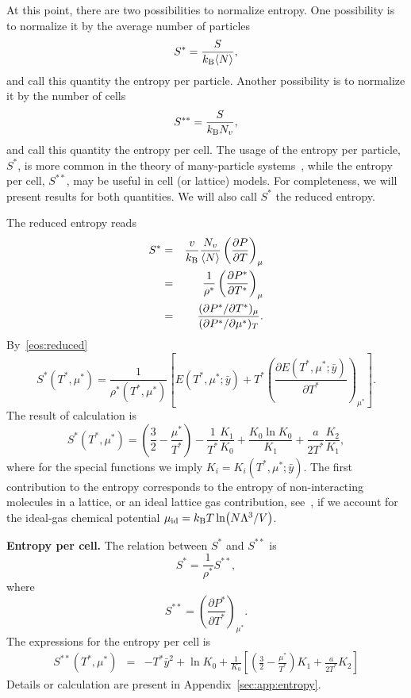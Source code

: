 \documentclass[12pt]{article}
\numberwithin{equation}{section}
\begin{document}
	At this point, there are two possibilities to normalize entropy. One possibility is to normalize it by the average number of particles
	\begin{equation}
		S^{*} = \frac{S}{k_{\rm B} \langle N \rangle},
	\end{equation}
	and call this quantity the entropy per particle. Another possibility is to normalize it by the number of cells
	\begin{equation}
		S^{**} = \frac{S}{k_{\rm B}N_v},
	\end{equation}
	and call this quantity the entropy per cell. The usage of the entropy per particle, $S^*$, is more common in the theory of many-particle systems~\cite{HansenMcDonald13}, while the entropy per cell, $S^{**}$, may be useful in cell (or lattice) models. For completeness, we will present results for both quantities. We will also call $S^*$ the reduced entropy.
	
	
	The reduced entropy reads
	\begin{eqnarray}
		S^* & = & \frac{v}{k_{\rm B}} \frac{N_v}{\langle N \rangle} \left(\frac{\partial P}{\partial T}\right)_{\mu}
		\\
		& = & \frac{1}{\rho^*}\left(\frac{\partial P^*}{\partial T^*}\right)_{\mu}
		\\
		& = & \frac{(\partial P^* / \partial T^*)_{\mu}}{(\partial P^* / \partial \mu^*)_T}.
	\end{eqnarray}
	By~\eqref{eos:reduced}
	\begin{equation}
		\label{eq:entropy}
		S^*(T^*,\mu^*) = \frac{1}{\rho^*(T^*,\mu^*)} 
		\left[ 
		E(T^*,\mu^*;\bar{y}) + T^* \left(\frac{\partial E(T^*,\mu^*;\bar{y})}{\partial T^*}\right)_{\mu^*} 
		\right].
	\end{equation}
	The result of calculation is
	\begin{equation}
		\label{S_vs_T_mu}
		S^*(T^*,\mu^*) = \left(\frac{3}{2} - \frac{\mu^*}{T^*}\right) - \frac{1}{T^*}\frac{K_1}{K_0} + \frac{K_0 \ln K_0}{K_1} + \frac{a}{2T^*} \frac{K_2}{K_1},
	\end{equation}
	where for the special functions we imply $K_i = K_i(T^*,\mu^*;\bar{y})$.
	The first contribution to the entropy corresponds to the entropy of non-interacting molecules in a lattice, or an ideal lattice gas contribution, see~\cite[(47.4)]{Hill56}, if we account for the ideal-gas chemical potential $\mu_{\rm id} = k_{\rm B}T \ln(N\Lambda^3/V)$. 
	
	
	\textbf{Entropy per cell.} The relation between $S^*$ and $S^{**}$ is
	\begin{equation}
		S^* = \frac{1}{\rho^*} S^{**},
	\end{equation}
	where
	\begin{equation}
		\label{eq:entropy2}
		S^{**}  = \left(\frac{\partial P^*}{\partial T^*}\right)_{\mu^*}.
	\end{equation}
	The expressions for the entropy per cell is
	\begin{eqnarray}
		S^{**}(T^*,\mu^*) & = & -T^* \bar{y}^2 + \ln K_0 + \frac{1}{K_0}\left[\left(\frac{3}{2} - \frac{\mu^*}{T^*}\right) K_1 + \frac{a}{2T^*} K_2 \right]
	\end{eqnarray}
	Details or calculation are present in Appendix~\ref{sec:app:entropy}.
	
\end{document}

